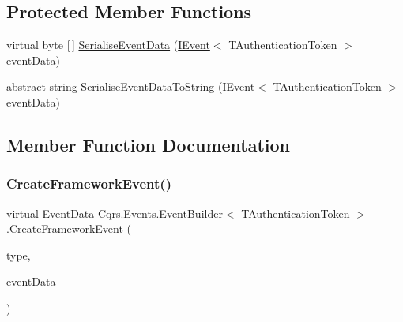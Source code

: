 \subsection*{Protected Member Functions}
\begin{DoxyCompactItemize}
\item 
virtual byte \mbox{[}$\,$\mbox{]} \hyperlink{classCqrs_1_1Events_1_1EventBuilder_a5392c1e86ea54fb96ee7af3a57f9af5a_a5392c1e86ea54fb96ee7af3a57f9af5a}{Serialise\+Event\+Data} (\hyperlink{interfaceCqrs_1_1Events_1_1IEvent}{I\+Event}$<$ T\+Authentication\+Token $>$ event\+Data)
\item 
abstract string \hyperlink{classCqrs_1_1Events_1_1EventBuilder_aefa7bfaea90123e143e108d46efc6603_aefa7bfaea90123e143e108d46efc6603}{Serialise\+Event\+Data\+To\+String} (\hyperlink{interfaceCqrs_1_1Events_1_1IEvent}{I\+Event}$<$ T\+Authentication\+Token $>$ event\+Data)
\end{DoxyCompactItemize}


\subsection{Member Function Documentation}
\mbox{\label{classCqrs_1_1Events_1_1EventBuilder_aa6a794ef27f2795802a4390fd16535f6_aa6a794ef27f2795802a4390fd16535f6}} 
\subsubsection{\texorpdfstring{Create\+Framework\+Event()}{CreateFrameworkEvent()}\hspace{0.1cm}{\footnotesize\ttfamily [1/2]}}
{\footnotesize\ttfamily virtual \hyperlink{classCqrs_1_1Events_1_1EventData}{Event\+Data} \hyperlink{classCqrs_1_1Events_1_1EventBuilder}{Cqrs.\+Events.\+Event\+Builder}$<$ T\+Authentication\+Token $>$.Create\+Framework\+Event (\begin{DoxyParamCaption}\item[{string}]{type,  }\item[{\hyperlink{interfaceCqrs_1_1Events_1_1IEvent}{I\+Event}$<$ T\+Authentication\+Token $>$}]{event\+Data }\end{DoxyParamCaption})\hspace{0.3cm}{\ttfamily [virtual]}}



